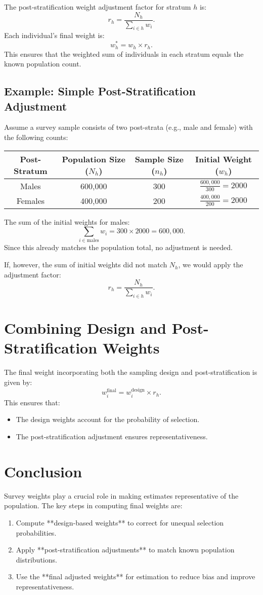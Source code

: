 \documentclass[12pt]{article}
\begin{document}
The post-stratification weight adjustment factor for stratum \( h \) is:
\[
r_h = \frac{N_h}{\sum_{i \in h} w_i}.
\]
Each individual's final weight is:
\[
w_{h}^{*} = w_h \times r_h.
\]
This ensures that the weighted sum of individuals in each stratum equals the known population count.

\subsection{Example: Simple Post-Stratification Adjustment}
Assume a survey sample consists of two post-strata (e.g., male and female) with the following counts:

\begin{center}
\begin{tabular}{|c|c|c|c|}
\hline
Post-Stratum & Population Size (\( N_h \)) & Sample Size (\( n_h \)) & Initial Weight (\( w_h \)) \\
\hline
Males & 600,000 & 300 & \( \frac{600,000}{300} = 2000 \) \\
Females & 400,000 & 200 & \( \frac{400,000}{200} = 2000 \) \\
\hline
\end{tabular}
\end{center}

The sum of the initial weights for males:
\[
\sum_{i \in \text{males}} w_i = 300 \times 2000 = 600,000.
\]
Since this already matches the population total, no adjustment is needed.

If, however, the sum of initial weights did not match \( N_h \), we would apply the adjustment factor:
\[
r_h = \frac{N_h}{\sum_{i \in h} w_i}.
\]

\section{Combining Design and Post-Stratification Weights}
The final weight incorporating both the sampling design and post-stratification is given by:
\[
w_i^{\text{final}} = w_i^{\text{design}} \times r_h.
\]
This ensures that:
\begin{itemize}
    \item The design weights account for the probability of selection.
    \item The post-stratification adjustment ensures representativeness.
\end{itemize}

\section{Conclusion}
Survey weights play a crucial role in making estimates representative of the population. The key steps in computing final weights are:
\begin{enumerate}
    \item Compute **design-based weights** to correct for unequal selection probabilities.
    \item Apply **post-stratification adjustments** to match known population distributions.
    \item Use the **final adjusted weights** for estimation to reduce bias and improve representativeness.
\end{enumerate}
\end{document}
